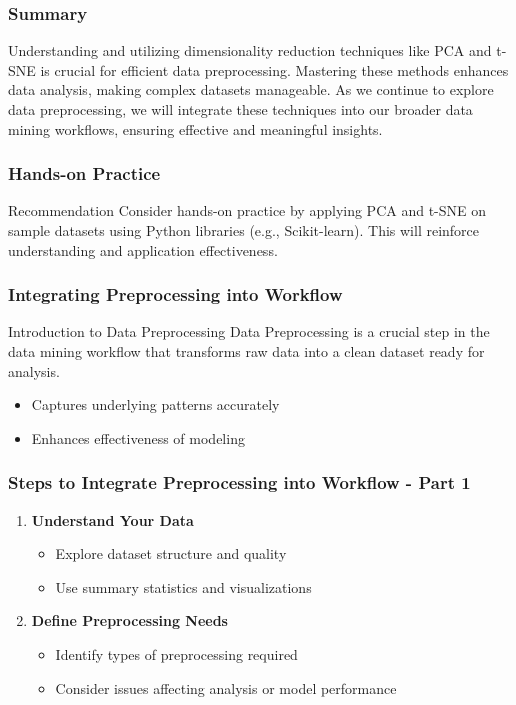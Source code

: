 \documentclass[aspectratio=169]{beamer}
\begin{document}
\begin{frame}[fragile]
    \frametitle{Summary}
    Understanding and utilizing dimensionality reduction techniques like PCA and t-SNE is crucial for efficient data preprocessing. Mastering these methods enhances data analysis, making complex datasets manageable. As we continue to explore data preprocessing, we will integrate these techniques into our broader data mining workflows, ensuring effective and meaningful insights.
\end{frame}

\begin{frame}[fragile]
    \frametitle{Hands-on Practice}
    \begin{block}{Recommendation}
        Consider hands-on practice by applying PCA and t-SNE on sample datasets using Python libraries (e.g., Scikit-learn). This will reinforce understanding and application effectiveness.
    \end{block}
\end{frame}

\begin{frame}[fragile]
    \frametitle{Integrating Preprocessing into Workflow}
    \begin{block}{Introduction to Data Preprocessing}
        Data Preprocessing is a crucial step in the data mining workflow that transforms raw data into a clean dataset ready for analysis. 
    \end{block}
    \begin{itemize}
        \item Captures underlying patterns accurately
        \item Enhances effectiveness of modeling
    \end{itemize}
\end{frame}

\begin{frame}[fragile]
    \frametitle{Steps to Integrate Preprocessing into Workflow - Part 1}
    \begin{enumerate}
        \item \textbf{Understand Your Data}
            \begin{itemize}
                \item Explore dataset structure and quality
                \item Use summary statistics and visualizations
            \end{itemize}
            
        \item \textbf{Define Preprocessing Needs}
            \begin{itemize}
                \item Identify types of preprocessing required
                \item Consider issues affecting analysis or model performance
            \end{itemize}
    \end{enumerate}
\end{frame}
\end{document}
